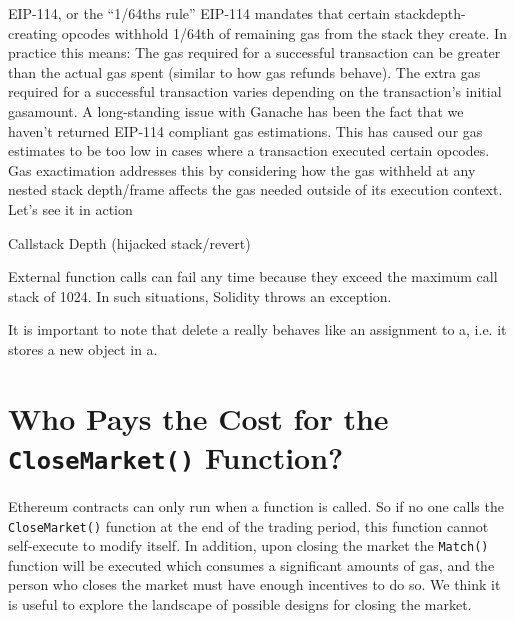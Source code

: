 EIP-114, or the “1/64ths rule”
EIP-114 mandates that certain stackdepth-creating opcodes withhold 1/64th of remaining gas from the stack they create. In practice this means:
The gas required for a successful transaction can be greater than the actual gas spent (similar to how gas refunds behave).
The extra gas required for a successful transaction varies depending on the transaction’s initial gasamount.
A long-standing issue with Ganache has been the fact that we haven’t returned EIP-114 compliant gas estimations. This has caused our gas estimates to be too low in cases where a transaction executed certain opcodes. Gas exactimation addresses this by considering how the gas withheld at any nested stack depth/frame affects the gas needed outside of its execution context.
Let’s see it in action


Callstack Depth (hijacked stack/revert)

External function calls can fail any time because they exceed the maximum call stack of 1024. In such situations, Solidity throws an exception.





It is important to note that delete a really behaves like an assignment to a, i.e. it stores a new object in a.


\section{Who Pays the Cost for the \texttt{CloseMarket()} Function?}

Ethereum contracts can only run when a function is called. So if no one calls the \texttt{CloseMarket()} function at the end of the trading period, this function cannot self-execute to modify itself. In addition, upon closing the market the \texttt{Match()} function will be executed which consumes a significant amounts of gas, and the person who closes the market must have enough incentives to do so. We think it is useful to explore the landscape of possible designs for closing the market. 

